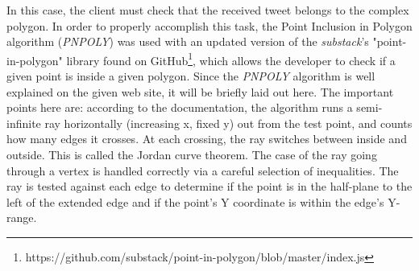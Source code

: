 \documentclass[a4paper,11pt]{report}
\begin{document}
\begin{itemize}
	In this case, the client must check that the received tweet belongs to the complex polygon. In order to properly accomplish this task, the Point Inclusion in Polygon algorithm (\emph{PNPOLY})\cite{RandolphFranklin2016} was used with an updated version of the \emph{substack}'s "point-in-polygon" library found on GitHub\footnote{https://github.com/substack/point-in-polygon/blob/master/index.js}, which allows the developer to check if a given point is inside a given polygon. Since the \emph{PNPOLY} algorithm is well explained on the given web site, it will be briefly laid out here. The important points here are: according to the documentation, the algorithm runs a semi-infinite ray horizontally (increasing x, fixed y) out from the test point, and counts how many edges it crosses. At each crossing, the ray switches between inside and outside. This is called the Jordan curve theorem. The case of the ray going through a vertex is handled correctly via a careful selection of inequalities. The ray is tested against each edge to determine if the point is in the half-plane to the left of the extended edge and if the point's Y coordinate is within the edge's Y-range.
\end{itemize}
\newpage
\end{document}
